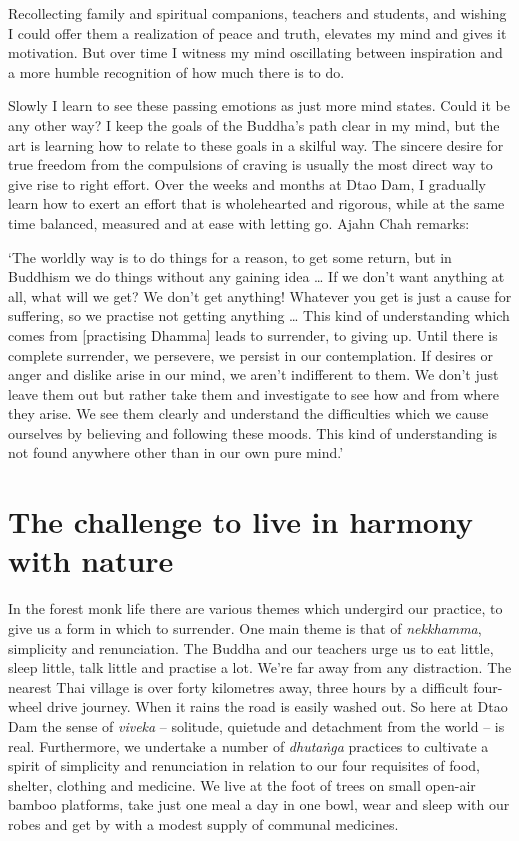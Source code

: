 Recollecting family and spiritual companions, teachers and students, and
wishing I could offer them a realization of peace and truth, elevates my
mind and gives it motivation. But over time I witness my mind
oscillating between inspiration and a more humble recognition of how
much there is to do.

Slowly I learn to see these passing emotions as
just more mind states. Could it be any other way? I keep the goals of
the Buddha's path clear in my mind, but the art is learning how to
relate to these goals in a skilful way. The sincere desire for true
freedom from the compulsions of craving is usually the most direct way
to give rise to right effort. Over the weeks and months at Dtao Dam, I
gradually learn how to exert an effort that is wholehearted and
rigorous, while at the same time balanced, measured and at ease with
letting go. Ajahn Chah remarks: 

`The worldly way is to do things for a reason, to get some return, but
in Buddhism we do things without any gaining idea \ldots{} If we don't
want anything at all, what will we get? We don't get anything! Whatever
you get is just a cause for suffering, so we practise not getting
anything \ldots{} This kind of understanding which comes from
[practising Dhamma] leads to surrender, to giving up. Until there is
complete surrender, we persevere, we persist in our contemplation. If
desires or anger and dislike arise in our mind, we aren't indifferent to
them. We don't just leave them out but rather take them and investigate
to see how and from where they arise. We see them clearly and understand
the difficulties which we cause ourselves by believing and following
these moods. This kind of understanding is not found anywhere other than
in our own pure mind.'

\section{The challenge to live in harmony with nature}

In the forest monk life there are various themes which undergird our
practice, to give us a form in which to surrender. One main theme is
that of \emph{nekkhamma}, simplicity and renunciation. The Buddha and
our teachers urge us to eat little, sleep little, talk little and
practise a lot. We're far away from any distraction. The nearest Thai
village is over forty kilometres away, three hours by a difficult
four-wheel drive journey. When it rains the road is easily washed out. 
So here at Dtao Dam the sense of \emph{viveka} -- solitude, quietude
and detachment from the world -- is real. Furthermore, we undertake a
number of \emph{dhutaṅga} practices to cultivate a spirit of simplicity
and renunciation in relation to our four requisites of food, shelter, 
clothing and medicine. We live at the foot of trees on small open-air
bamboo platforms, take just one meal a day in one bowl, wear and sleep
with our robes and get by with a modest supply of communal medicines. 

